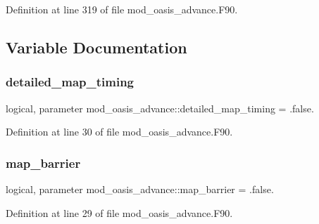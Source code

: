 Definition at line 319 of file mod\+\_\+oasis\+\_\+advance.\+F90.



\subsection{Variable Documentation}
\mbox{\label{namespacemod__oasis__advance_aad8e5c2e16b0270a7da0800a14ae1e07}} 
\subsubsection{\texorpdfstring{detailed\+\_\+map\+\_\+timing}{detailed\_map\_timing}}
{\footnotesize\ttfamily logical, parameter mod\+\_\+oasis\+\_\+advance\+::detailed\+\_\+map\+\_\+timing = .false.\hspace{0.3cm}{\ttfamily [private]}}



Definition at line 30 of file mod\+\_\+oasis\+\_\+advance.\+F90.

\mbox{\label{namespacemod__oasis__advance_ac617024af9299c27eaeb9156f647b028}} 
\subsubsection{\texorpdfstring{map\+\_\+barrier}{map\_barrier}}
{\footnotesize\ttfamily logical, parameter mod\+\_\+oasis\+\_\+advance\+::map\+\_\+barrier = .false.\hspace{0.3cm}{\ttfamily [private]}}



Definition at line 29 of file mod\+\_\+oasis\+\_\+advance.\+F90.

